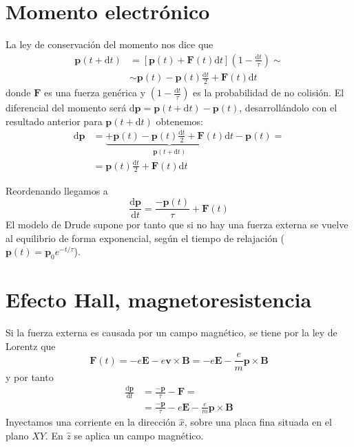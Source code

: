 \section{Momento electrónico}
La ley de conservación del momento nos dice que
\begin{equation}
\begin{split}
  \mathbf{p}(t + \text{d}t) &= [\mathbf{p}(t) +
  \mathbf{F}(t)\text{d}t]\left( 1- \frac{\text{d}t}{\tau} \right) \sim
  \\ &\sim \mathbf{p}(t) - \mathbf{p}(t)\frac{\text{d}t}{2} + \mathbf{F}(t)\text{d}t
\end{split}
\end{equation}
donde $\mathbf{F}$ es una fuerza genérica y
$\left( 1- \frac{\text{d}t}{\tau} \right)$ es la probabilidad de no
colisión. El diferencial del momento será
$\text{d}\mathbf{p} = \mathbf{p}(t+\text{d}t) - \mathbf{p}(t)$,
desarrollándolo con el resultado anterior para
$\mathbf{p}(t+\text{d}t)$ obtenemos:
\begin{equation}
\begin{split}
  \text{d}\mathbf{p} &= \underbrace{+\mathbf{p}(t) -
\mathbf{p}(t)\frac{\text{d}t}{2} + \mathbf{F}(t)
\text{d}t}_{\mathbf{p}(t + \text{d}t)} - \mathbf{p}(t) = \\ &=
\mathbf{p}(t)\frac{\text{d}t}{2} + \mathbf{F}(t) \text{d}t
\end{split}
\end{equation}

Reordenando llegamos a
\begin{equation}
  \frac{\text{d}\mathbf{p}}{\text{d}t} = \frac{-\mathbf{p}(t)}{\tau} + \mathbf{F}(t)
\end{equation}
El modelo de Drude supone por tanto que si no hay una fuerza externa
se vuelve al equilibrio de forma exponencial, según el tiempo de
relajación ($\mathbf{p}(t) = \mathbf{p}_0 e^{-t/\tau}$).

\section{Efecto Hall, magnetoresistencia}
Si la fuerza externa es causada por un campo magnético, se tiene por
la ley de Lorentz que
\begin{equation}
  \mathbf{F}(t) = -e \mathbf{E} - e \mathbf{v}\times \mathbf{B} = -e
                  \mathbf{E} - \frac{e}{m} \mathbf{p}\times \mathbf{B}
\end{equation}
y por tanto
\begin{equation}
\begin{split}
  \frac{\text{d}\mathbf{p}}{\text{d}t} &= \frac{-\mathbf{p}}{\tau}-
                                         \mathbf{F} = \\
                                       &= \frac{-\mathbf{p}}{\tau} - e
                                         \mathbf{E} - \frac{e}{m}
                                         \mathbf{p}\times \mathbf{B}
\end{split}
\end{equation}
Inyectamos una corriente en la dirección
$\hat x$, sobre una placa fina situada en el plano
$XY$. En $\hat z$ se aplica un campo magnético.

